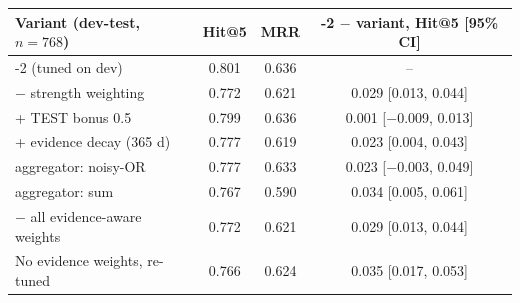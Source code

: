 \begin{tabular}{lccc}
\toprule
Variant (dev-test, $n{=}768$) & Hit@5 & MRR & \sys{}-2 $-$ variant, Hit@5 [95\% CI] \\
\midrule
\sys{}-2 (tuned on dev) & 0.801 & 0.636 & -- \\
$-$ strength weighting & 0.772 & 0.621 & 0.029 [0.013, 0.044] \\
+ TEST bonus 0.5 & 0.799 & 0.636 & 0.001 [$-$0.009, 0.013] \\
+ evidence decay (365 d) & 0.777 & 0.619 & 0.023 [0.004, 0.043] \\
aggregator: noisy-OR & 0.777 & 0.633 & 0.023 [$-$0.003, 0.049] \\
aggregator: sum & 0.767 & 0.590 & 0.034 [0.005, 0.061] \\
$-$ all evidence-aware weights & 0.772 & 0.621 & 0.029 [0.013, 0.044] \\
No evidence weights, re-tuned & 0.766 & 0.624 & 0.035 [0.017, 0.053] \\
\bottomrule
\end{tabular}